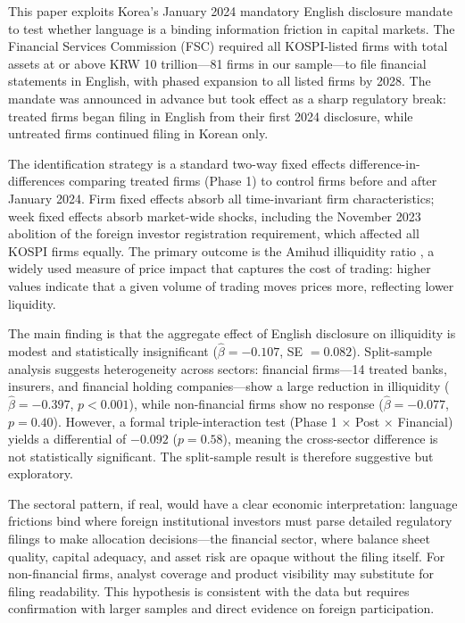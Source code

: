 \documentclass[12pt]{article}
\begin{document}
This paper exploits Korea's January 2024 mandatory English disclosure mandate to test whether language is a binding information friction in capital markets. The Financial Services Commission (FSC) required all KOSPI-listed firms with total assets at or above KRW 10 trillion---81 firms in our sample---to file financial statements in English, with phased expansion to all listed firms by 2028. The mandate was announced in advance but took effect as a sharp regulatory break: treated firms began filing in English from their first 2024 disclosure, while untreated firms continued filing in Korean only.

The identification strategy is a standard two-way fixed effects difference-in-differences comparing treated firms (Phase 1) to control firms before and after January 2024. Firm fixed effects absorb all time-invariant firm characteristics; week fixed effects absorb market-wide shocks, including the November 2023 abolition of the foreign investor registration requirement, which affected all KOSPI firms equally. The primary outcome is the Amihud illiquidity ratio \citep{amihud2002}, a widely used measure of price impact that captures the cost of trading: higher values indicate that a given volume of trading moves prices more, reflecting lower liquidity.

The main finding is that the aggregate effect of English disclosure on illiquidity is modest and statistically insignificant ($\hat{\beta} = -0.107$, SE $= 0.082$). Split-sample analysis suggests heterogeneity across sectors: financial firms---14 treated banks, insurers, and financial holding companies---show a large reduction in illiquidity ($\hat{\beta} = -0.397$, $p < 0.001$), while non-financial firms show no response ($\hat{\beta} = -0.077$, $p = 0.40$). However, a formal triple-interaction test (Phase 1 $\times$ Post $\times$ Financial) yields a differential of $-0.092$ ($p = 0.58$), meaning the cross-sector difference is not statistically significant. The split-sample result is therefore suggestive but exploratory.

The sectoral pattern, if real, would have a clear economic interpretation: language frictions bind where foreign institutional investors must parse detailed regulatory filings to make allocation decisions---the financial sector, where balance sheet quality, capital adequacy, and asset risk are opaque without the filing itself. For non-financial firms, analyst coverage and product visibility may substitute for filing readability. This hypothesis is consistent with the data but requires confirmation with larger samples and direct evidence on foreign participation.
\end{document}
